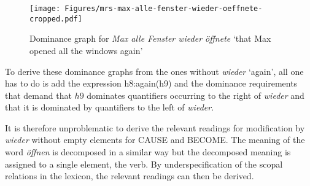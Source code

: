 \begin{figure}[htb]
\centering
\texttt{[image: Figures/mrs-max-alle-fenster-wieder-oeffnete-cropped.pdf]}
\caption{Dominance graph for \emph{Max alle Fenster wieder öffnete} `that Max opened all the
  windows again'\label{Abbildung-Max-alle-Fenster-wieder-oeffnete}}
\end{figure}%
To derive these dominance graphs from the ones without \emph{wieder} `again', all one has to do is add the expression h8:again(h9)
and the dominance requirements that demand that $h9$ dominates quantifiers occurring to the right of \emph{wieder} and that it
is dominated by quantifiers to the left of \emph{wieder}.

It is therefore unproblematic to derive the relevant readings for modification by \emph{wieder}
without empty elements for CAUSE and BECOME. The meaning of the word \emph{öffnen} is decomposed in a similar way but the
decomposed meaning is assigned to a single element, the verb. By underspecification of the scopal
relations in the lexicon, the relevant readings can then be derived. 



